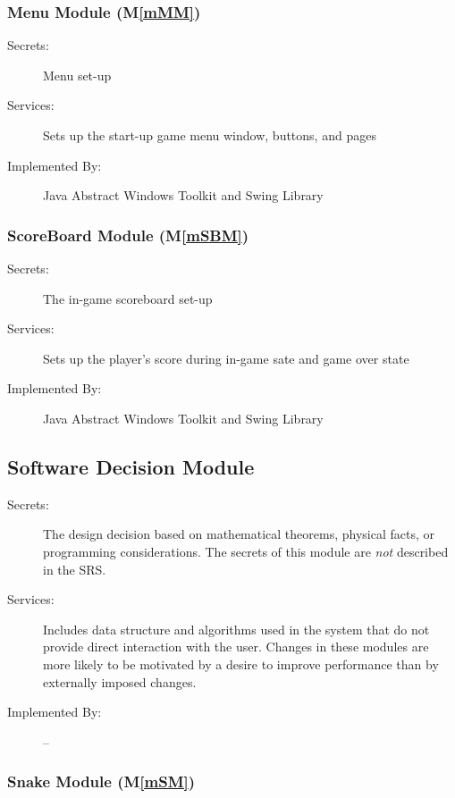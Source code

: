 \documentclass[12pt, titlepage]{article}
\newcommand{\mref}[1]{M\ref{#1}}
\begin{document}
\subsubsection{Menu Module (\mref{mMM})}

\begin{description}
\item[Secrets:] Menu set-up
\item[Services:] Sets up the start-up game menu window, buttons, and pages
\item[Implemented By:] Java Abstract Windows Toolkit and Swing Library
\end{description}

\subsubsection{ScoreBoard Module (\mref{mSBM})}

\begin{description}
\item[Secrets:] The in-game scoreboard set-up 
\item[Services:] Sets up the player's score during in-game sate and game over state
\item[Implemented By:] Java Abstract Windows Toolkit and Swing Library
\end{description}

\subsection{Software Decision Module}

\begin{description}
\item[Secrets:] The design decision based on mathematical theorems, physical
  facts, or programming considerations. The secrets of this module are
  \emph{not} described in the SRS.
\item[Services:] Includes data structure and algorithms used in the system that
  do not provide direct interaction with the user. 
  Changes in these modules are more likely to be motivated by a desire to
  improve performance than by externally imposed changes.
\item[Implemented By:] --
\end{description}

\subsubsection{Snake Module (\mref{mSM})}
\end{document}
